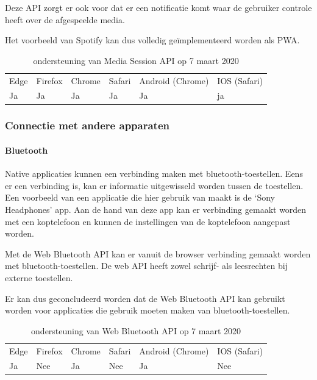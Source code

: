 Deze API zorgt er ook voor dat er een notificatie komt waar de gebruiker controle heeft over de afgespeelde media. 

Het voorbeeld van Spotify kan dus volledig geïmplementeerd worden als PWA.

\begin{table}[H]
	\centering
	\begin{tabular}{llllll}
		Edge & Firefox & Chrome & Safari & Android (Chrome) & IOS (Safari) \\
		Ja   & Ja      & Ja     & Ja     & Ja               & ja          
	\end{tabular}	
	\caption{ondersteuning van Media Session API op 7 maart 2020}
\end{table}



\subsubsection{Connectie met andere apparaten}



\paragraph{Bluetooth }

Native applicaties kunnen een verbinding maken met bluetooth-toestellen. Eens er een verbinding is, kan er informatie uitgewisseld worden tussen de toestellen. Een voorbeeld van een applicatie die hier gebruik van maakt is de ‘Sony Headphones’ app. Aan de hand van deze app kan er verbinding gemaakt worden met een koptelefoon en kunnen de instellingen van de koptelefoon aangepast worden.

Met de Web Bluetooth API \autocite{Grant2020} kan er vanuit de browser verbinding gemaakt worden met bluetooth-toestellen. De web API heeft zowel schrijf- als leesrechten bij externe toestellen. 

Er kan dus geconcludeerd worden dat de Web Bluetooth API kan gebruikt worden voor applicaties die gebruik moeten maken van bluetooth-toestellen.
\autocite{Beaufort2019a}

\begin{table}[H]
	\centering
	\begin{tabular}{llllll}
		Edge & Firefox & Chrome & Safari & Android (Chrome) & IOS (Safari) \\
		Ja   & Nee      & Ja     & Nee     & Ja               & Nee          
	\end{tabular}	
	\caption{ondersteuning van Web Bluetooth API op 7 maart 2020}
\end{table}



